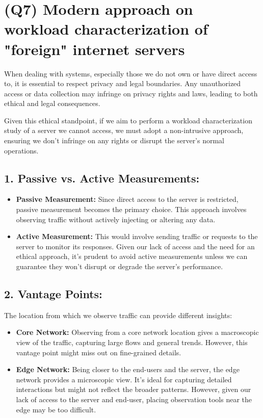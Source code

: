 \documentclass{article}
\begin{document}
\section*{(Q7) Modern approach on workload characterization of "foreign" internet servers}
When dealing with systems, especially those we do not own or have direct access to, it is essential to respect privacy and legal boundaries.
Any unauthorized access or data collection may infringe on privacy rights and laws, leading to both ethical and legal consequences.

Given this ethical standpoint, if we aim to perform a workload characterization study of a server we cannot access, we must adopt a non-intrusive approach, ensuring we don't infringe on any rights or disrupt the server's normal operations.

\subsection*{1. Passive vs. Active Measurements:} 
\begin{itemize}
    \item \textbf{Passive Measurement:} Since direct access to the server is restricted, passive measurement becomes the primary choice. This approach involves observing traffic without actively injecting or altering any data.
    \item \textbf{Active Measurement:} This would involve sending traffic or requests to the server to monitor its responses. Given our lack of access and the need for an ethical approach, it's prudent to avoid active measurements unless we can guarantee they won't disrupt or degrade the server's performance.
\end{itemize}

\subsection*{2. Vantage Points:} 
The location from which we observe traffic can provide different insights:
\begin{itemize}
    \item \textbf{Core Network:} Observing from a core network location gives a macroscopic view of the traffic, capturing large flows and general trends. However, this vantage point might miss out on fine-grained details.
    \item \textbf{Edge Network:} Being closer to the end-users and the server, the edge network provides a microscopic view. It's ideal for capturing detailed interactions but might not reflect the broader patterns. However, given our lack of access to the server and end-user, placing observation tools near the edge may be too difficult.
\end{itemize}
\end{document}
